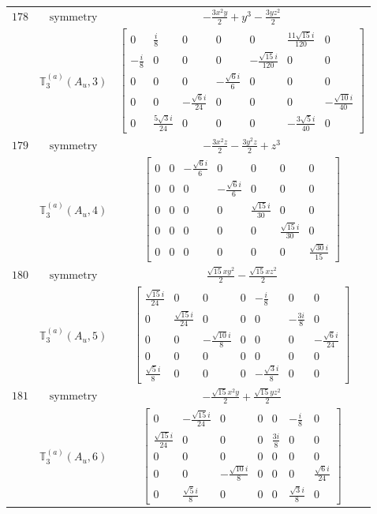 \documentclass[fleqn,8pt,landscape]{jsarticle}
\begin{document}
\begin{longtable}{ccc}
$ 178 $ & $ \text{symmetry} $ & $ - \frac{3 x^{2} y}{2} + y^{3} - \frac{3 y z^{2}}{2} $ \\
$  $ & $ \mathbb{T}_{3}^{(a)}(A_{u},3) $ & $ \begin{bmatrix} 0 & \frac{i}{8} & 0 & 0 & 0 & \frac{11 \sqrt{15} i}{120} & 0 \\ - \frac{i}{8} & 0 & 0 & 0 & - \frac{\sqrt{15} i}{120} & 0 & 0 \\ 0 & 0 & 0 & - \frac{\sqrt{6} i}{6} & 0 & 0 & 0 \\ 0 & 0 & - \frac{\sqrt{6} i}{24} & 0 & 0 & 0 & - \frac{\sqrt{10} i}{40} \\ 0 & \frac{5 \sqrt{3} i}{24} & 0 & 0 & 0 & - \frac{3 \sqrt{5} i}{40} & 0 \end{bmatrix} $ \\ \hline
$ 179 $ & $ \text{symmetry} $ & $ - \frac{3 x^{2} z}{2} - \frac{3 y^{2} z}{2} + z^{3} $ \\
$  $ & $ \mathbb{T}_{3}^{(a)}(A_{u},4) $ & $ \begin{bmatrix} 0 & 0 & - \frac{\sqrt{6} i}{6} & 0 & 0 & 0 & 0 \\ 0 & 0 & 0 & - \frac{\sqrt{6} i}{6} & 0 & 0 & 0 \\ 0 & 0 & 0 & 0 & \frac{\sqrt{15} i}{30} & 0 & 0 \\ 0 & 0 & 0 & 0 & 0 & \frac{\sqrt{15} i}{30} & 0 \\ 0 & 0 & 0 & 0 & 0 & 0 & \frac{\sqrt{30} i}{15} \end{bmatrix} $ \\ \hline
$ 180 $ & $ \text{symmetry} $ & $ \frac{\sqrt{15} x y^{2}}{2} - \frac{\sqrt{15} x z^{2}}{2} $ \\
$  $ & $ \mathbb{T}_{3}^{(a)}(A_{u},5) $ & $ \begin{bmatrix} \frac{\sqrt{15} i}{24} & 0 & 0 & 0 & - \frac{i}{8} & 0 & 0 \\ 0 & \frac{\sqrt{15} i}{24} & 0 & 0 & 0 & - \frac{3 i}{8} & 0 \\ 0 & 0 & - \frac{\sqrt{10} i}{8} & 0 & 0 & 0 & - \frac{\sqrt{6} i}{24} \\ 0 & 0 & 0 & 0 & 0 & 0 & 0 \\ \frac{\sqrt{5} i}{8} & 0 & 0 & 0 & - \frac{\sqrt{3} i}{8} & 0 & 0 \end{bmatrix} $ \\ \hline
$ 181 $ & $ \text{symmetry} $ & $ - \frac{\sqrt{15} x^{2} y}{2} + \frac{\sqrt{15} y z^{2}}{2} $ \\
$  $ & $ \mathbb{T}_{3}^{(a)}(A_{u},6) $ & $ \begin{bmatrix} 0 & - \frac{\sqrt{15} i}{24} & 0 & 0 & 0 & - \frac{i}{8} & 0 \\ \frac{\sqrt{15} i}{24} & 0 & 0 & 0 & \frac{3 i}{8} & 0 & 0 \\ 0 & 0 & 0 & 0 & 0 & 0 & 0 \\ 0 & 0 & - \frac{\sqrt{10} i}{8} & 0 & 0 & 0 & \frac{\sqrt{6} i}{24} \\ 0 & \frac{\sqrt{5} i}{8} & 0 & 0 & 0 & \frac{\sqrt{3} i}{8} & 0 \end{bmatrix} $ \\ \hline

\end{longtable}
\end{document}
